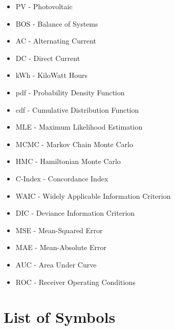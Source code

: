 \begin{itemize}

\item[] PV -  Photovoltaic
\item[] BOS - Balance of Systems
\item[] AC - Alternating Current
\item[] DC - Direct Current
\item[] kWh - KiloWatt Hours

\item[] pdf - Probability Density Function
\item[] cdf - Cumulative Distribution Function
\item[] MLE - Maximum Likelihood Estimation
\item[] MCMC - Markov Chain Monte Carlo
\item[] HMC - Hamiltonian Monte Carlo

\item[] C-Index - Concordance Index
\item[] WAIC - Widely Applicable Information Criterion
\item[] DIC - Deviance Information Criterion

\item[] MSE - Mean-Squared Error
\item[] MAE - Mean-Absolute Error

\item[] AUC - Area Under Curve
\item[] ROC - Receiver Operating Conditions


\end{itemize}

\newpage

\section*{List of Symbols}

